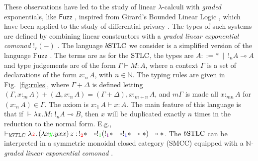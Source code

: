 These observations have led to the study of linear $\lambda$-calculi with \emph{graded} exponentials, like $\mathsf{Fuzz}$ \cite{Reed2010}, inspired from Girard's Bounded Linear Logic \cite{Girard92tcs}, which have been applied to the study of differential privacy \cite{Gaboardi2013, Gaboardi2017}. The types of such systems are defined by combining linear constructors with a \emph{graded linear exponential comonad} $!_{r}(-)$ \cite{Katsumata2018}.
The language $\BSTLC$ we consider is a simplified version of the language $\mathrm{Fuzz}$ \cite{Reed2010}. 
The terms are as for the $\mathrm{STLC}$, the types are $A::= * \ \mid  \ !_{n}A \multimap A$ and type judgements are of the form $\Gamma \vdash M:A$, where a context $\Gamma$ is a set of declarations of the form $x :_{n}A$, with $n\in \mathbb N$.
The typing rules are given in Fig.~\ref{fig:rules}, where $\Gamma+\Delta$ is defined letting $(\Gamma, x:_{m} A)+( \Delta, x:_{n} A) =  (\Gamma+\Delta), x:_{m+n}A$, and $m\Gamma$ is made all $x:_{mn}A$ for $(x:_{n}A) \in \Gamma$.  
The axiom is $x:_{1}A\vdash x: A$.
The main feature of this language is that if $\vdash \lambda x.M:\,!_nA\multimap B$, then $x$ will be duplicated exactly $n$ times in the reduction to the normal form. %
E.g., $\vdash_{\BSTLC} \lambda {\color{red}z}.\left( \lambda x{\color{green}y}. yxx \right)z : \, !_{\color{red}2} *\multimap !_{\color{green}1}(!_{\color{violet}1} * \multimap !_{\color{blue}1} * \multimap *) \multimap *$.
The $\BSTLC$ can be interpreted in a symmetric monoidal closed category (SMCC) equipped with a \emph{$\mathbb N$-graded linear exponential comonad} \cite{Katsumata2018}.

